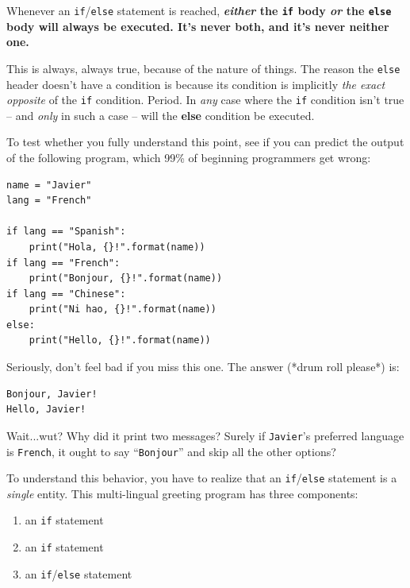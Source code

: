 \label{cardinalRule}

\begin{shaded}
Whenever an \texttt{if}/\texttt{else} statement is reached,
\textbf{\textit{either} the \texttt{if} body \textit{or} the \texttt{else}
body will always be executed. It's never both, and it's never neither one.}
\end{shaded}

This is always, always true, because of the nature of things. The reason the
\texttt{else} header doesn't have a condition is because its condition is
implicitly \textit{the exact opposite} of the \texttt{if} condition. Period. In
\textit{any} case where the \texttt{if} condition isn't true -- and
\textit{only} in such a case -- will the \textbf{else} condition be executed.

To test whether you fully understand this point, see if you can predict the
output of the following program, which 99\% of beginning programmers get wrong:

\label{spanishFrenchPitfall}

\begin{Verbatim}[fontsize=\small,samepage=true,frame=single,framesep=3mm]
name = "Javier"
lang = "French"

if lang == "Spanish":
    print("Hola, {}!".format(name))
if lang == "French":
    print("Bonjour, {}!".format(name))
if lang == "Chinese":
    print("Ni hao, {}!".format(name))
else:
    print("Hello, {}!".format(name))
\end{Verbatim}
\vspace{-.2in}

Seriously, don't feel bad if you miss this one. The answer (*drum roll please*)
is:

\begin{Verbatim}[fontsize=\small,samepage=true,frame=leftline,framesep=5mm,framerule=1mm]
Bonjour, Javier!
Hello, Javier!
\end{Verbatim}

Wait...wut? Why did it print two messages? Surely if \texttt{Javier}'s
preferred language is \texttt{French}, it ought to say ``\texttt{Bonjour}'' and
skip all the other options?

To understand this behavior, you have to realize that an
\texttt{if}/\texttt{else} statement is a \textit{single} entity. This
multi-lingual greeting program has three components:

\begin{samepage}
\begin{enumerate}[nosep]
\item an \texttt{if} statement
\item an \texttt{if} statement
\item an \texttt{if}/\texttt{else} statement
\end{enumerate}
\end{samepage}

